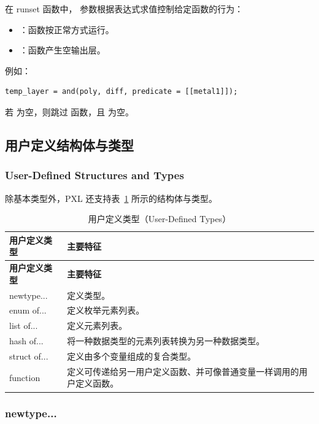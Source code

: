 在 runset 函数中， 参数根据表达式求值控制给定函数的行为：
\begin{itemize}
  \item {}：函数按正常方式运行。
  \item {}：函数产生空输出层。
\end{itemize}

例如：
\begin{lstlisting}[style=pxl]
temp_layer = and(poly, diff, predicate = [[metal1]]);
\end{lstlisting}

若  为空，则跳过  函数，且  为空。

\subsection{用户定义结构体与类型}
\subsubsection*{User-Defined Structures and Types}

除基本类型外，PXL 还支持表~\ref{tab:pxl-user-types} 所示的结构体与类型。

\begin{longtable}{@{}>{\raggedright\arraybackslash\ttfamily}p{} p{}@{}}
\caption{用户定义类型（User-Defined Types）}\label{tab:pxl-user-types}\\
\toprule
\textbf{\textrm{用户定义类型}} & \textbf{\textrm{主要特征}} \\
\midrule
\endfirsthead
\toprule
\textbf{\textrm{用户定义类型}} & \textbf{\textrm{主要特征}} \\
\midrule
\endhead
\bottomrule
\endfoot
newtype... & 定义类型。 \\
enum of... & 定义枚举元素列表。 \\
list of... & 定义元素列表。 \\
hash of... & 将一种数据类型的元素列表转换为另一种数据类型。 \\
struct of... & 定义由多个变量组成的复合类型。 \\
function & 定义可传递给另一用户定义函数、并可像普通变量一样调用的用户定义函数。 \\
\end{longtable}

\subsubsection{newtype...}
